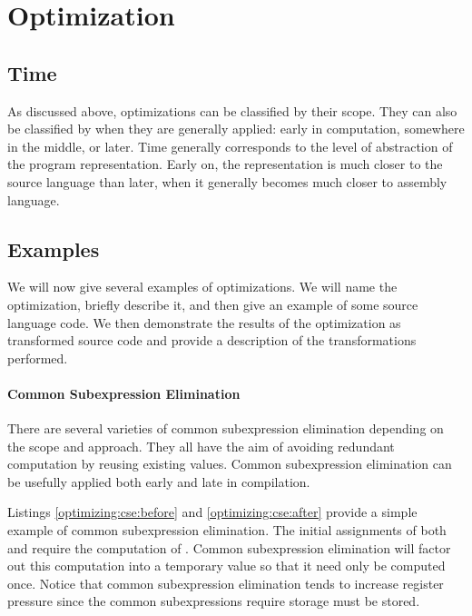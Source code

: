 \section{Optimization}
\subsection{Time}
As discussed above, optimizations can be classified by their scope. They can also be classified by when they are generally applied: early in computation, somewhere in the middle, or later. Time generally corresponds to the level of abstraction of the program representation. Early on, the representation is much closer to the source language than later, when it generally becomes much closer to assembly language.

\subsection{Examples}
We will now give several examples of optimizations. We will name the optimization, briefly describe it, and then give an example of some source language code. We then demonstrate the results of the optimization as transformed source code and provide a description of the transformations performed.
\paragraph{Common Subexpression Elimination}
There are several varieties of common subexpression elimination depending on the scope and approach. They all have the aim of avoiding redundant computation by reusing existing values. Common subexpression elimination can be usefully applied both early and late in compilation.

Listings \ref{optimizing:cse:before} and \ref{optimizing:cse:after} provide a simple example of common subexpression elimination. The initial assignments of both  and  require the computation of . Common subexpression elimination will factor out this computation into a temporary value so that it need only be computed once. Notice that common subexpression elimination tends to increase register pressure since the common subexpressions require storage must be stored.





